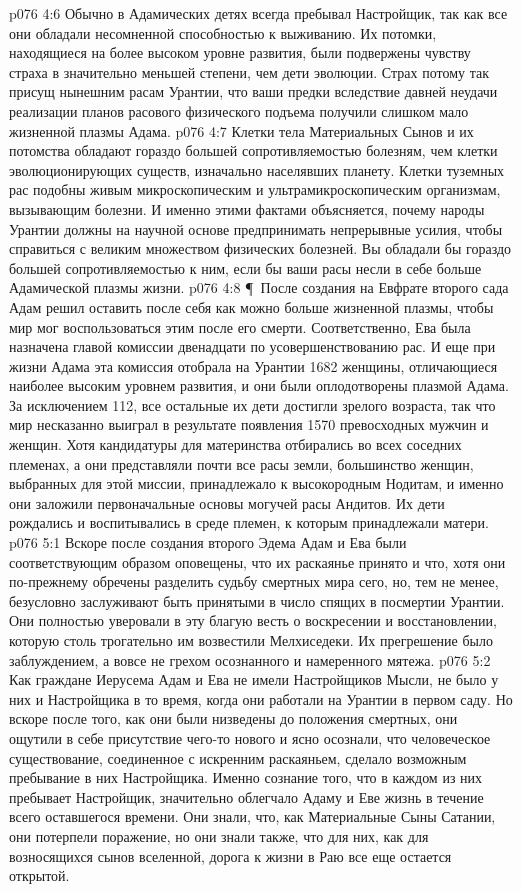 \vs p076 4:6 Обычно в Адамических детях всегда пребывал Настройщик, так как все они обладали несомненной способностью к выживанию. Их потомки, находящиеся на более высоком уровне развития, были подвержены чувству страха в значительно меньшей степени, чем дети эволюции. Страх потому так присущ нынешним расам Урантии, что ваши предки вследствие давней неудачи реализации планов расового физического подъема получили слишком мало жизненной плазмы Адама.
\vs p076 4:7 Клетки тела Материальных Сынов и их потомства обладают гораздо большей сопротивляемостью болезням, чем клетки эволюционирующих существ, изначально населявших планету. Клетки туземных рас подобны живым микроскопическим и ультрамикроскопическим организмам, вызывающим болезни. И именно этими фактами объясняется, почему народы Урантии должны на научной основе предпринимать непрерывные усилия, чтобы справиться с великим множеством физических болезней. Вы обладали бы гораздо большей сопротивляемостью к ним, если бы ваши расы несли в себе больше Адамической плазмы жизни.
\vs p076 4:8 \P\ После создания на Евфрате второго сада Адам решил оставить после себя как можно больше жизненной плазмы, чтобы мир мог воспользоваться этим после его смерти. Соответственно, Ева была назначена главой комиссии двенадцати по усовершенствованию рас. И еще при жизни Адама эта комиссия отобрала на Урантии 1682 женщины, отличающиеся наиболее высоким уровнем развития, и они были оплодотворены плазмой Адама. За исключением 112, все остальные их дети достигли зрелого возраста, так что мир несказанно выиграл в результате появления 1570 превосходных мужчин и женщин. Хотя кандидатуры для материнства отбирались во всех соседних племенах, а они представляли почти все расы земли, большинство женщин, выбранных для этой миссии, принадлежало к высокородным Нодитам, и именно они заложили первоначальные основы могучей расы Андитов. Их дети рождались и воспитывались в среде племен, к которым принадлежали матери.
\vs p076 5:1 Вскоре после создания второго Эдема Адам и Ева были соответствующим образом оповещены, что их раскаянье принято и что, хотя они по\hyp{}прежнему обречены разделить судьбу смертных мира сего, но, тем не менее, безусловно заслуживают быть принятыми в число спящих в посмертии Урантии. Они полностью уверовали в эту благую весть о воскресении и восстановлении, которую столь трогательно им возвестили Мелхиседеки. Их прегрешение было заблуждением, а вовсе не грехом осознанного и намеренного мятежа.
\vs p076 5:2 Как граждане Иерусема Адам и Ева не имели Настройщиков Мысли, не было у них и Настройщика в то время, когда они работали на Урантии в первом саду. Но вскоре после того, как они были низведены до положения смертных, они ощутили в себе присутствие чего\hyp{}то нового и ясно осознали, что человеческое существование, соединенное с искренним раскаяньем, сделало возможным пребывание в них Настройщика. Именно сознание того, что в каждом из них пребывает Настройщик, значительно облегчало Адаму и Еве жизнь в течение всего оставшегося времени. Они знали, что, как Материальные Сыны Сатании, они потерпели поражение, но они знали также, что для них, как для возносящихся сынов вселенной, дорога к жизни в Раю все еще остается открытой.
